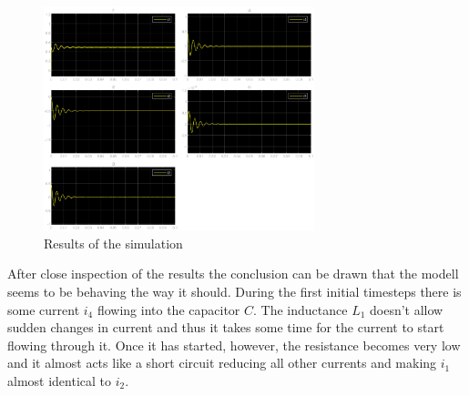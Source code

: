 \begin{figure}[H]
		\centering
		\includegraphics[width=0.7\textwidth]{figures/results.eps}
		\caption{Results of the simulation}
		\label{fig:results}
	\end{figure}
After close inspection of the results the conclusion can be drawn that the modell seems to be behaving the way it should. During the first initial timesteps there is some current $i_4$ flowing into the capacitor $C$. The inductance $L_1$ doesn't allow sudden changes in current and thus it takes some time for the current to start flowing through it. Once it has started, however, the resistance becomes very low and it almost acts like a short circuit reducing all other currents and making $i_1$ almost identical to $i_2$.
